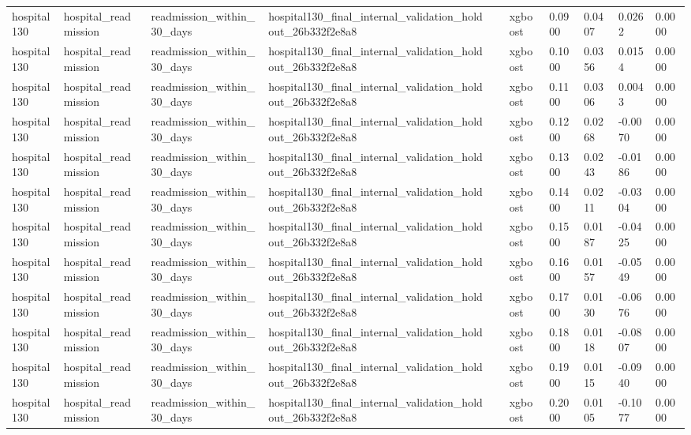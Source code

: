 \begin{tabular}{llllllllll}
hospital130 & hospital\_readmission & readmission\_within\_30\_days & hospital130\_final\_internal\_validation\_holdout\_26b332f2e8a8 &  & xgboost & 0.0900 & 0.0407 & 0.0262 & 0.0000 \\
hospital130 & hospital\_readmission & readmission\_within\_30\_days & hospital130\_final\_internal\_validation\_holdout\_26b332f2e8a8 &  & xgboost & 0.1000 & 0.0356 & 0.0154 & 0.0000 \\
hospital130 & hospital\_readmission & readmission\_within\_30\_days & hospital130\_final\_internal\_validation\_holdout\_26b332f2e8a8 &  & xgboost & 0.1100 & 0.0306 & 0.0043 & 0.0000 \\
hospital130 & hospital\_readmission & readmission\_within\_30\_days & hospital130\_final\_internal\_validation\_holdout\_26b332f2e8a8 &  & xgboost & 0.1200 & 0.0268 & -0.0070 & 0.0000 \\
hospital130 & hospital\_readmission & readmission\_within\_30\_days & hospital130\_final\_internal\_validation\_holdout\_26b332f2e8a8 &  & xgboost & 0.1300 & 0.0243 & -0.0186 & 0.0000 \\
hospital130 & hospital\_readmission & readmission\_within\_30\_days & hospital130\_final\_internal\_validation\_holdout\_26b332f2e8a8 &  & xgboost & 0.1400 & 0.0211 & -0.0304 & 0.0000 \\
hospital130 & hospital\_readmission & readmission\_within\_30\_days & hospital130\_final\_internal\_validation\_holdout\_26b332f2e8a8 &  & xgboost & 0.1500 & 0.0187 & -0.0425 & 0.0000 \\
hospital130 & hospital\_readmission & readmission\_within\_30\_days & hospital130\_final\_internal\_validation\_holdout\_26b332f2e8a8 &  & xgboost & 0.1600 & 0.0157 & -0.0549 & 0.0000 \\
hospital130 & hospital\_readmission & readmission\_within\_30\_days & hospital130\_final\_internal\_validation\_holdout\_26b332f2e8a8 &  & xgboost & 0.1700 & 0.0130 & -0.0676 & 0.0000 \\
hospital130 & hospital\_readmission & readmission\_within\_30\_days & hospital130\_final\_internal\_validation\_holdout\_26b332f2e8a8 &  & xgboost & 0.1800 & 0.0118 & -0.0807 & 0.0000 \\
hospital130 & hospital\_readmission & readmission\_within\_30\_days & hospital130\_final\_internal\_validation\_holdout\_26b332f2e8a8 &  & xgboost & 0.1900 & 0.0115 & -0.0940 & 0.0000 \\
hospital130 & hospital\_readmission & readmission\_within\_30\_days & hospital130\_final\_internal\_validation\_holdout\_26b332f2e8a8 &  & xgboost & 0.2000 & 0.0105 & -0.1077 & 0.0000 \\

\end{tabular}
